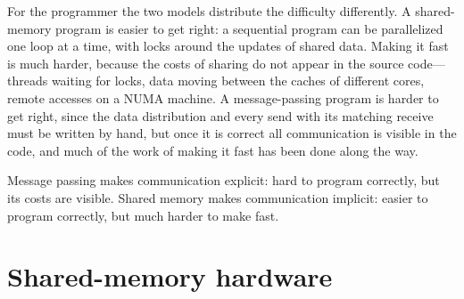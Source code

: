 \documentclass[../main.tex]{subfiles}
\begin{document}
For the programmer the two models distribute the difficulty differently.
A shared-memory program is easier to get right: a sequential program can be
parallelized one loop at a time, with locks around the updates of shared
data.  Making it fast is much harder, because the costs of sharing do not
appear in the source code---threads waiting for locks, data moving between
the caches of different cores, remote accesses on a NUMA machine.  A
message-passing program is harder to get right, since the data distribution
and every send with its matching receive must be written by hand, but once
it is correct all communication is visible in the code, and much of the
work of making it fast has been done along the way.

\begin{keypoint}
  Message passing makes communication explicit: hard to program correctly,
  but its costs are visible.  Shared memory makes communication implicit:
  easier to program correctly, but much harder to make fast.
\end{keypoint}

\section{Shared-memory hardware}
\label{sec:l18-mt-hardware}
\end{document}
